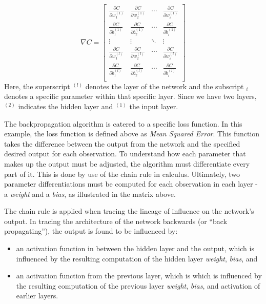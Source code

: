 \[
\nabla{C} =
\begin{bmatrix}
\frac{\partial{C}}{\partial{w_1^{(1)}}} & \frac{\partial{C}}{\partial{w_2^{(1)}}} & \cdots & 
\frac{\partial{C}}{\partial{w_i^{(1)}}} \\
\frac{\partial{C}}{\partial{b_1^{(1)}}} & \frac{\partial{C}}{\partial{b_2^{(1)}}} & \cdots & 
\frac{\partial{C}}{\partial{b_i^{(1)}}} \\
\vdots & \vdots & \ddots & \vdots \\
\frac{\partial{C}}{\partial{w_1^{(l)}}} & \frac{\partial{C}}{\partial{w_2^{(l)}}} & \cdots & 
\frac{\partial{C}}{\partial{w_i^{(l)}}} \\
\frac{\partial{C}}{\partial{b_1^{(l)}}} & \frac{\partial{C}}{\partial{b_2^{(l)}}} & \cdots & 
\frac{\partial{C}}{\partial{b_i^{(l)}}} \\
\end{bmatrix}
\] Here, the superscript \(^{(l)}\) denotes the layer of the network and
the subscript \(_i\) denotes a specific parameter within that specific
layer. Since we have two layers, \(^{(2)}\) indicates the hidden layer
and \(^{(1)}\) the input layer.

The backpropagation algorithm is catered to a specific loss function. In
this example, the loss function is defined above as \emph{Mean Squared
Error}. This function takes the difference between the output from the
network and the specified desired output for each observation. To
understand how each parameter that makes up the output must be adjusted,
the algorithm must differentiate every part of it. This is done by use
of the chain rule in calculus. Ultimately, two parameter
differentiations must be computed for each observation in each layer - a
\emph{weight} and a \emph{bias}, as illustrated in the matrix above.

The chain rule is applied when tracing the lineage of influence on the
network's output. In tracing the architecture of the network backwards
(or ``back propagating''), the output is found to be influenced by:

\begin{itemize}
\tightlist
\item
  an activation function in between the hidden layer and the output,
  which is influenced by the resulting computation of the hidden layer
  \emph{weight}, \emph{bias}, and
\item
  an activation function from the previous layer, which is which is
  influenced by the resulting computation of the previous layer
  \emph{weight}, \emph{bias}, and activation of earlier layers.
\end{itemize}

